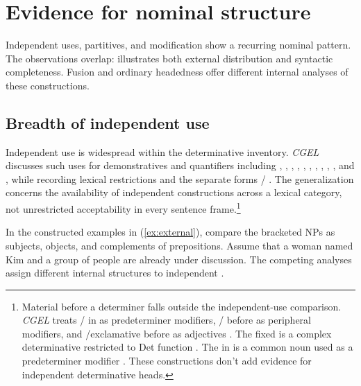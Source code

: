 \documentclass[12pt]{article}
\begin{document}
\section{Evidence for nominal structure}\label{sec:evidence}

Independent uses, partitives, and modification show a recurring nominal pattern. The observations overlap:  illustrates both external distribution and syntactic completeness. Fusion and ordinary headedness offer different internal analyses of these constructions.

\subsection{Breadth of independent use}\label{sec:independent}

Independent use is widespread within the determinative inventory. \textit{CGEL} discusses such uses for demonstratives and quantifiers including , , , , , , , , , , and , while recording lexical restrictions and the separate forms / \citep[371--372, 410--424]{huddleston2002}. The generalization concerns the availability of independent constructions across a lexical category, not unrestricted acceptability in every sentence frame.\footnote{Material before a determiner falls outside the independent-use comparison. \textit{CGEL} treats / in  as predeterminer modifiers, / before  as peripheral modifiers, and /exclamative  before  as adjectives \citep[433--437]{huddleston2002}. The fixed  is a complex determinative restricted to Det function \citep[394]{huddleston2002}. The  in  is a common noun used as a predeterminer modifier \citep[434]{huddleston2002}. These constructions don't add evidence for independent determinative heads.}

In the constructed examples in (\ref{ex:external}), compare the bracketed NPs as subjects, objects, and complements of prepositions. Assume that a woman named Kim and a group of people are already under discussion. The competing analyses assign different internal structures to independent .

\begin{samepage}
\ea\label{ex:external}
\ea {}\qquad {}\qquad {}
\ex {}\qquad {}\qquad {}
\ex {}\qquad {}\qquad {}
\ex {}\qquad {}\qquad {}
\z\z
\end{samepage}
\end{document}
